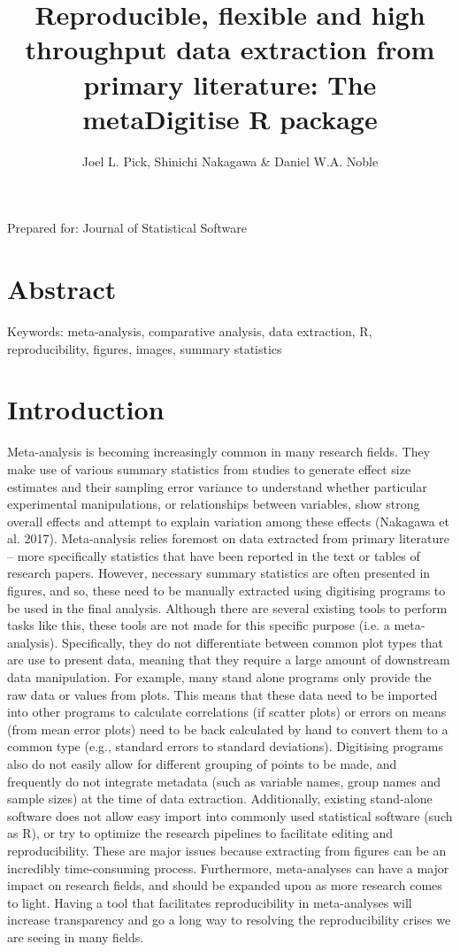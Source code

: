 \documentclass{article}
\title{Reproducible, flexible and high throughput data extraction from primary literature: The metaDigitise R package}
\author{Joel L. Pick, Shinichi Nakagawa \& Daniel W.A. Noble}
\begin{document}
\doublespacing

\maketitle
Prepared for: Journal of Statistical Software

\section*{Abstract}

Keywords: meta-analysis, comparative analysis, data extraction, R, reproducibility, figures, images, summary statistics

\clearpage
\section*{Introduction}

Meta-analysis is becoming increasingly common in many research fields. They make use of various summary statistics from studies to generate effect size estimates and their sampling error variance to understand whether particular experimental manipulations, or relationships between variables, show strong overall effects and attempt to explain variation among these effects (Nakagawa et al. 2017). Meta-analysis relies foremost on data extracted from primary literature – more specifically statistics that have been reported in the text or tables of research papers. However, necessary summary statistics are often presented in figures, and so, these need to be manually extracted using digitising programs to be used in the final analysis. Although there are several existing tools to perform tasks like this, these tools are not made for this specific purpose (i.e. a meta-analysis). Specifically, they do not differentiate between common plot types that are use to present data, meaning that they require a large amount of downstream data manipulation. For example, many stand alone programs only provide the raw data or values from plots. This means that these data need to be imported into other programs to calculate correlations (if scatter plots) or errors on means (from mean error plots) need to be back calculated by hand to convert them to a common type (e.g., standard errors to standard deviations). Digitising programs also do not easily allow for different grouping of points to be made, and frequently do not integrate metadata (such as variable names, group names and sample sizes) at the time of data extraction. Additionally, existing stand-alone software does not allow easy import into commonly used statistical software (such as R), or try to optimize the research pipelines to facilitate editing and reproducibility. These are major issues because extracting from figures can be an incredibly time-consuming process. Furthermore, meta-analyses can have a major impact on research fields, and should be expanded upon as more research comes to light. Having a tool that facilitates reproducibility in meta-analyses will increase transparency and go a long way to resolving the reproducibility crises we are seeing in many fields.
\end{document}

